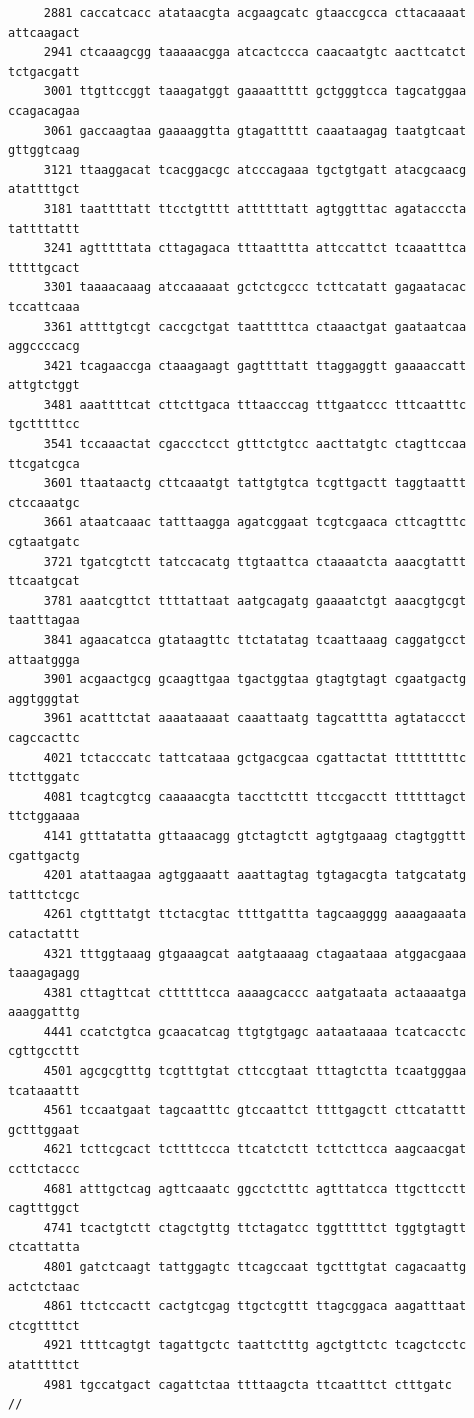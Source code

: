 \documentclass[11pt]{article}
\begin{document}
\begin{verbatim}
     2881 caccatcacc atataacgta acgaagcatc gtaaccgcca cttacaaaat attcaagact
     2941 ctcaaagcgg taaaaacgga atcactccca caacaatgtc aacttcatct tctgacgatt
     3001 ttgttccggt taaagatggt gaaaattttt gctgggtcca tagcatggaa ccagacagaa
     3061 gaccaagtaa gaaaaggtta gtagattttt caaataagag taatgtcaat gttggtcaag
     3121 ttaaggacat tcacggacgc atcccagaaa tgctgtgatt atacgcaacg atattttgct
     3181 taattttatt ttcctgtttt attttttatt agtggtttac agatacccta tattttattt
     3241 agtttttata cttagagaca tttaatttta attccattct tcaaatttca tttttgcact
     3301 taaaacaaag atccaaaaat gctctcgccc tcttcatatt gagaatacac tccattcaaa
     3361 attttgtcgt caccgctgat taatttttca ctaaactgat gaataatcaa aggccccacg
     3421 tcagaaccga ctaaagaagt gagttttatt ttaggaggtt gaaaaccatt attgtctggt
     3481 aaattttcat cttcttgaca tttaacccag tttgaatccc tttcaatttc tgctttttcc
     3541 tccaaactat cgaccctcct gtttctgtcc aacttatgtc ctagttccaa ttcgatcgca
     3601 ttaataactg cttcaaatgt tattgtgtca tcgttgactt taggtaattt ctccaaatgc
     3661 ataatcaaac tatttaagga agatcggaat tcgtcgaaca cttcagtttc cgtaatgatc
     3721 tgatcgtctt tatccacatg ttgtaattca ctaaaatcta aaacgtattt ttcaatgcat
     3781 aaatcgttct ttttattaat aatgcagatg gaaaatctgt aaacgtgcgt taatttagaa
     3841 agaacatcca gtataagttc ttctatatag tcaattaaag caggatgcct attaatggga
     3901 acgaactgcg gcaagttgaa tgactggtaa gtagtgtagt cgaatgactg aggtgggtat
     3961 acatttctat aaaataaaat caaattaatg tagcatttta agtataccct cagccacttc
     4021 tctacccatc tattcataaa gctgacgcaa cgattactat tttttttttc ttcttggatc
     4081 tcagtcgtcg caaaaacgta taccttcttt ttccgacctt ttttttagct ttctggaaaa
     4141 gtttatatta gttaaacagg gtctagtctt agtgtgaaag ctagtggttt cgattgactg
     4201 atattaagaa agtggaaatt aaattagtag tgtagacgta tatgcatatg tatttctcgc
     4261 ctgtttatgt ttctacgtac ttttgattta tagcaagggg aaaagaaata catactattt
     4321 tttggtaaag gtgaaagcat aatgtaaaag ctagaataaa atggacgaaa taaagagagg
     4381 cttagttcat cttttttcca aaaagcaccc aatgataata actaaaatga aaaggatttg
     4441 ccatctgtca gcaacatcag ttgtgtgagc aataataaaa tcatcacctc cgttgccttt
     4501 agcgcgtttg tcgtttgtat cttccgtaat tttagtctta tcaatgggaa tcataaattt
     4561 tccaatgaat tagcaatttc gtccaattct ttttgagctt cttcatattt gctttggaat
     4621 tcttcgcact tcttttccca ttcatctctt tcttcttcca aagcaacgat ccttctaccc
     4681 atttgctcag agttcaaatc ggcctctttc agtttatcca ttgcttcctt cagtttggct
     4741 tcactgtctt ctagctgttg ttctagatcc tggtttttct tggtgtagtt ctcattatta
     4801 gatctcaagt tattggagtc ttcagccaat tgctttgtat cagacaattg actctctaac
     4861 ttctccactt cactgtcgag ttgctcgttt ttagcggaca aagatttaat ctcgttttct
     4921 ttttcagtgt tagattgctc taattctttg agctgttctc tcagctcctc atatttttct
     4981 tgccatgact cagattctaa ttttaagcta ttcaatttct ctttgatc
//
\end{verbatim}
\end{document}
